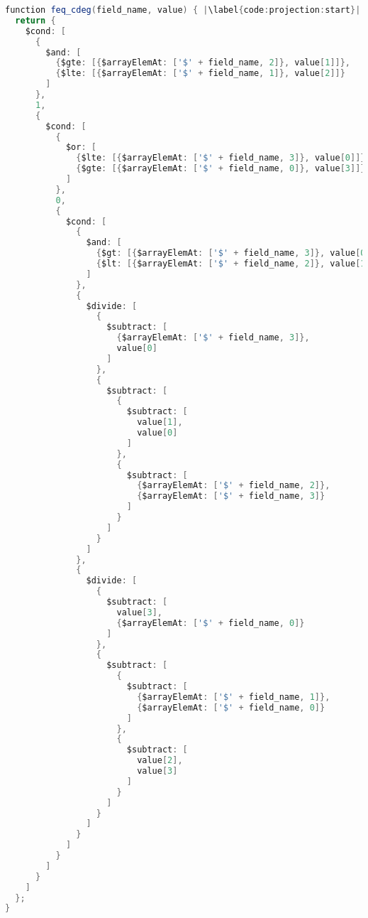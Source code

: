 \begin{lstlisting}[language=java, escapechar=|]
function feq_cdeg(field_name, value) { |\label{code:projection:start}|
  return {
    $cond: [
      {
        $and: [
          {$gte: [{$arrayElemAt: ['$' + field_name, 2]}, value[1]]},
          {$lte: [{$arrayElemAt: ['$' + field_name, 1]}, value[2]]}
        ]
      },
      1,
      {
        $cond: [
          {
            $or: [
              {$lte: [{$arrayElemAt: ['$' + field_name, 3]}, value[0]]},
              {$gte: [{$arrayElemAt: ['$' + field_name, 0]}, value[3]]}
            ]
          },
          0,
          {
            $cond: [
              {
                $and: [
                  {$gt: [{$arrayElemAt: ['$' + field_name, 3]}, value[0]]},
                  {$lt: [{$arrayElemAt: ['$' + field_name, 2]}, value[1]]}
                ]
              },
              {
                $divide: [
                  {
                    $subtract: [
                      {$arrayElemAt: ['$' + field_name, 3]},
                      value[0]
                    ]
                  },
                  {
                    $subtract: [
                      {
                        $subtract: [
                          value[1],
                          value[0]
                        ]
                      },
                      {
                        $subtract: [
                          {$arrayElemAt: ['$' + field_name, 2]},
                          {$arrayElemAt: ['$' + field_name, 3]}
                        ]
                      }
                    ]
                  }
                ]
              },
              {
                $divide: [
                  {
                    $subtract: [
                      value[3],
                      {$arrayElemAt: ['$' + field_name, 0]}
                    ]
                  },
                  {
                    $subtract: [
                      {
                        $subtract: [
                          {$arrayElemAt: ['$' + field_name, 1]},
                          {$arrayElemAt: ['$' + field_name, 0]}
                        ]
                      },
                      {
                        $subtract: [
                          value[2],
                          value[3]
                        ]
                      }
                    ]
                  }
                ]
              }
            ]
          }
        ]
      }
    ]
  };
}


\end{lstlisting}
